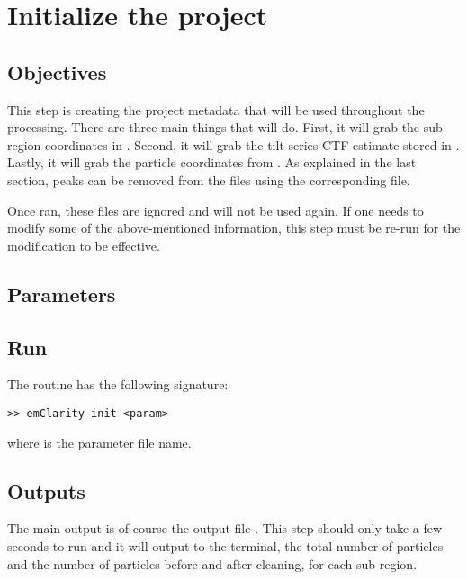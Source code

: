 \section{Initialize the project} \label{sec:init}

\subsection{Objectives}
This step is creating the project metadata that will be used throughout the processing. There are three main things that {\emClarity} will do. First, it will grab the sub-region coordinates in . Second, it will grab the tilt-series CTF estimate stored in . Lastly, it will grab the particle coordinates from . As explained in the last section, peaks can be removed from the  files using the corresponding  file.

\begin{note}Once ran, these files are ignored and will not be used again. If one needs to modify some of the above-mentioned information, this step must be re-run for the modification to be effective.
\end{note}


\subsection{Parameters}




\subsection{Run}

The  routine has the following signature:
\begin{lstlisting}
>> emClarity init <param>
\end{lstlisting}
where  is the parameter file name.

\subsection{Outputs}

The main output is of course the output file . This step should only take a few seconds to run and it will output to the terminal, the total number of particles and the number of particles before and after cleaning, for each sub-region.